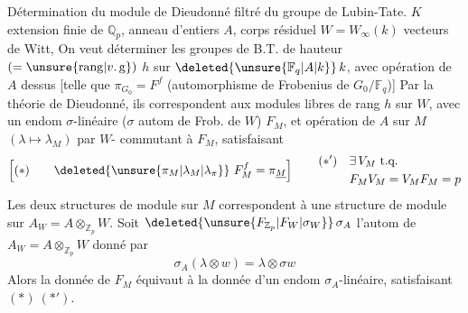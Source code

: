 Détermination du module de Dieudonné filtré du groupe de Lubin-Tate.
$K$ extension finie de $\mathbb Q_p$, anneau d'entiers $A$, corps résiduel
$W=W_\infty(k)$ vecteurs de Witt,
On veut déterminer  les groupes de B.T.  de hauteur $(=\unsure{\mathrm{rang}|v.\,\mathrm{g}})$ $h$ sur $\deleted{\unsure{\mathbb F_q|A|k}}\,k$, avec opération de $A$ dessus [telle que $\pi_{G_0}=F^f$ (automorphisme de Frobenius de $G_0/\mathbb F_q$)]
Par la théorie de Dieudonné, ils correspondent aux modules libres  de rang $h$ sur $W$, avec un endom $\sigma$-linéaire ($\sigma$ autom de Frob. de $W$) $F_M$, et opération de $A$ sur $M$ $(\lambda\mapsto\lambda_M)$ par $W$- commutant à $F_M$, satisfaisant
\[
\left[(*)\qquad\deleted{\unsure{\pi_M|\lambda_M|\lambda_\pi}}\ F_M^f=\pi_{\underline M}\right]
\qquad
\begin{aligned}
(*')\quad&\exists\,V_M\ \text{t.q.}\\
&F_MV_M=V_MF_M=p
\end{aligned}
\]
Les deux structures de module sur $M$ correspondent à une structure de module sur $A_W=A\otimes_{\mathbb Z_p}W$. Soit $\deleted{\unsure{F_{\mathbb Z_p}|F_W|\sigma_W}}\,\sigma_A$ l'autom de $A_W=A\otimes_{\mathbb Z_p}W$ donné par
\[
\sigma_A(\lambda\otimes w)=\lambda\otimes\sigma w
\]
Alors la donnée de $F_M$ équivaut à la donnée d'un endom $\sigma_A$-linéaire, satisfaisant $(*)\ (*')$.
